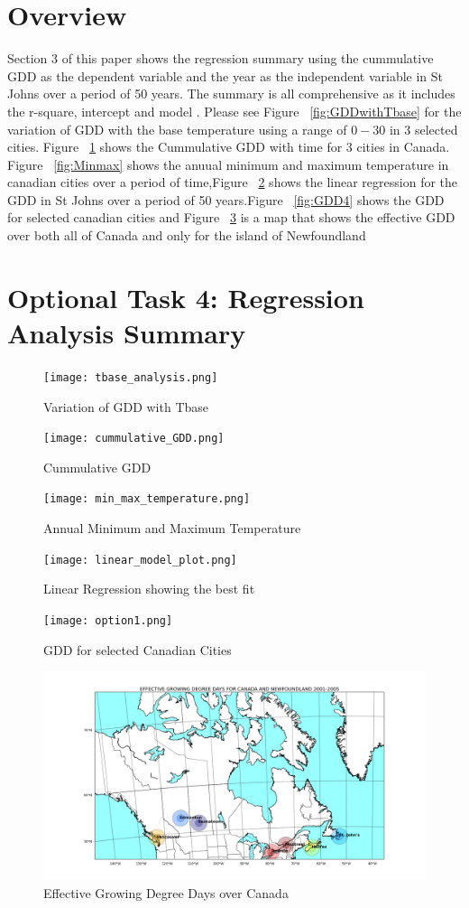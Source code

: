 \documentclass[12pt]{article}
\begin{document}
\noindent
\section{ \bf Overview}
Section 3 of this paper shows the regression summary using the cummulative GDD as the dependent variable and the year as the independent variable in St Johns over a period of 50 years. The summary is all comprehensive as it includes the  r-square, intercept and model .
Please see Figure ~\ref{fig:GDDwithTbase} for the variation of GDD with the base temperature using a range of $0-30$ in 3 selected cities. Figure ~\ref{fig:cumGDD} shows the Cummulative GDD with time for 3 cities in Canada. Figure ~\ref{fig:Minmax} shows the anuual minimum and maximum temperature in canadian cities over a period of time,Figure ~\ref{fig:linreg} shows the linear regression for the GDD in St Johns over a period of 50 years.Figure ~\ref{fig:GDD4} shows the GDD for selected canadian cities  and Figure ~\ref{fig:EffGDD} is a map that shows the effective GDD over both all of Canada and only for the island of Newfoundland
\section{\bf Optional Task 4: Regression Analysis Summary}
\begin{figure}[tb]
 \texttt{[image: tbase\_analysis.png]}
 \caption{Variation of GDD with Tbase}
\label{fig:GDDwithTbase}
 \texttt{[image: cummulative\_GDD.png]}
  \caption{Cummulative GDD }
\label{fig:cumGDD}


\end{figure}

\begin{figure}[p!]
 
 \texttt{[image: min\_max\_temperature.png]}
  \caption{Annual Minimum and Maximum Temperature}
\label{fig:Minmax}
 \texttt{[image: linear\_model\_plot.png]}
  \caption{Linear Regression showing the best fit}
\label{fig:linreg}


\end{figure}
\begin{figure}[h!]
 
 \texttt{[image: option1.png]}
  \caption{GDD for selected Canadian Cities}
\label{fig:GDD4}
 \includegraphics[width=18cm]{EffectiveGdd_1.png}
  \caption{Effective Growing Degree Days over Canada}
\label{fig:EffGDD}

\end{figure}
\end{document}
